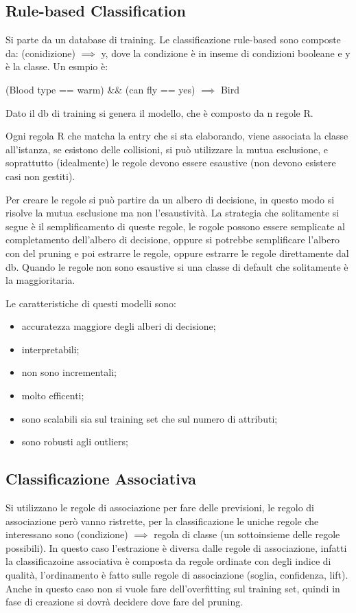 \documentclass[12pt]{article}
\begin{document}
\subsection{Rule-based Classification}
Si parte da un database di training. Le classificazione rule-based sono composte da: (conidizione) $ \implies $ y, dove la condizione \`e in inseme di condizioni booleane e y \`e la classe. Un esmpio \`e:
\begin{center}
    (Blood type == warm) \&\& (can fly == yes) $ \implies$ Bird
\end{center}
Dato il db di training si genera il modello, che \`e composto da n regole R.

Ogni regola R che matcha la entry che si sta elaborando, viene associata la classe all'istanza, se esistono delle collisioni, si pu\`o utilizzare la mutua esclusione, e soprattutto (idealmente) le regole devono essere esaustive (non devono esistere casi non gestiti).

Per creare le regole si pu\`o partire da un albero di decisione, in questo modo si risolve la mutua esclusione ma non l'esaustivit\`a. La strategia che solitamente si segue \`e il semplificamento di queste regole, le rogole possono essere semplicate al completamento dell'albero di decisione, oppure si potrebbe semplificare l'albero con del pruning e poi estrarre le regole, oppure estrarre  le regole direttamente dal db. Quando le regole non sono esaustive si una classe di default che solitamente \`e la maggioritaria.

Le caratteristiche di questi modelli sono:
\begin{itemize}
    \item accuratezza maggiore degli alberi di decisione;
    \item interpretabili;
    \item non sono incrementali;
    \item molto efficenti;
    \item sono scalabili sia sul training set che sul numero di attributi;
    \item sono robusti agli outliers;
\end{itemize}


\subsection{Classificazione Associativa}
Si utilizzano le regole di associazione per fare delle previsioni, le regolo di associazione per\`o vanno ristrette, per la classificazione le uniche regole che interessano sono (condizione) $ \implies $ regola di classe (un sottoinsieme delle regole possibili). In questo caso l'estrazione \`e diversa dalle regole di associazione, infatti la classificazoine associativa \`e composta da regole ordinate con degli indice di qualit\`a, l'ordinamento \`e fatto sulle regole di associazione (soglia, confidenza, lift). Anche in questo caso non si vuole fare dell'overfitting sul training set, quindi in fase di creazione si dovr\`a decidere dove fare del pruning.
\end{document}

